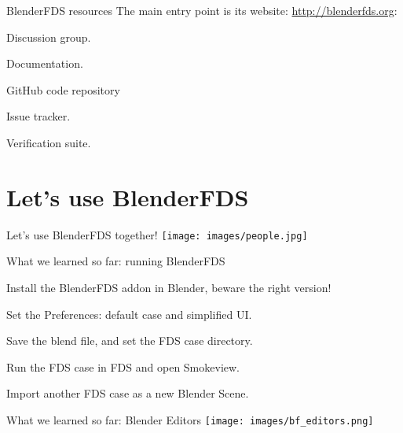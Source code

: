 \documentclass[aspectratio=169]{beamer}
\begin{document}
\begin{frame}[fragile]{BlenderFDS resources}
    The main entry point is its website: \url{http://blenderfds.org}:
    \begin{vfilleditems}
        \item Discussion group.
        \item Documentation.
        \item GitHub code repository
        \item Issue tracker.
        \item Verification suite.
    \end{vfilleditems}
\end{frame}

\section{Let's use BlenderFDS}
\begin{frame}[fragile]{}
  \centering
  \vfill
  {\fontsize{20}{50}\selectfont Let's use BlenderFDS}
  \linebreak
  {\fontsize{40}{50}\selectfont together!}
  \centering
  \vfill
  \texttt{[image: images/people.jpg]}
  \vfill
\end{frame}

\begin{frame}[fragile]{What we learned so far: \linebreak running BlenderFDS}
    \begin{vfilleditems}
        \item Install the BlenderFDS addon in Blender, beware the right version!
        \item Set the Preferences: default case and simplified UI.
        \item Save the blend file, and set the FDS case directory.
        \item Run the FDS case in FDS and open Smokeview.
        \item Import another FDS case as a new Blender Scene.
    \end{vfilleditems}
\end{frame}

\begin{frame}[fragile]{What we learned so far: Blender Editors}
  \centering
  \vfill
  \texttt{[image: images/bf\_editors.png]}
  \vfill
\end{frame}
\end{document}
